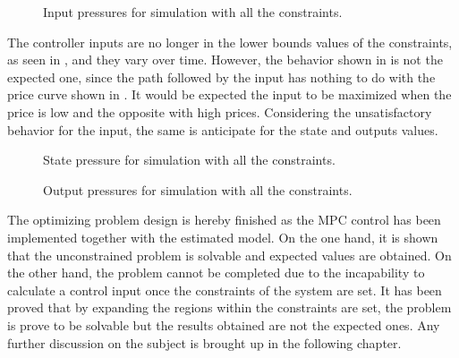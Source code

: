 \begin{figure}[H]
\centering
 
\caption{Input pressures for simulation with all the constraints.}
\label{fig:Output_input}
\end{figure}

The controller inputs are no longer in the lower bounds values of the constraints, as seen in , and they vary over time. However, the behavior shown in  is not the expected one, since the path followed by the input has nothing to do with the price curve shown in . It would be expected the input to be maximized when the price is low and the opposite with high prices. Considering the unsatisfactory behavior for the input, the same is anticipate for the state and outputs values. 

\begin{figure}[H]
\centering
 
\caption{State pressure for simulation with all the constraints.}
\label{fig:Output_input}
\end{figure}

\begin{figure}[H]
\centering
 
\caption{Output pressures for simulation with all the constraints.}
\label{fig:Output_input}
\end{figure}



The optimizing problem design is hereby finished as the MPC control has been implemented together with the estimated model. On the one hand, it is shown that the unconstrained problem is solvable and expected values are obtained. On the other hand, the problem cannot be completed due to the incapability to calculate a control input once the constraints of the system are set. It has been proved that by expanding the regions within the constraints are set, the problem is prove to be solvable but the results obtained are not the expected ones. Any further discussion on the subject is brought up in the following chapter. 

